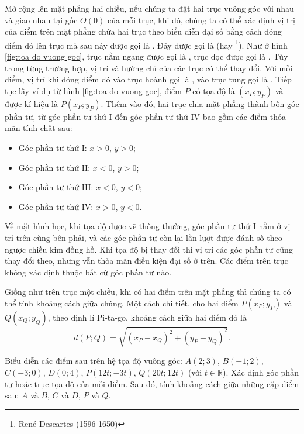 Mở rộng lên mặt phẳng hai chiều, nếu chúng ta đặt hai trục vuông góc với nhau và giao nhau tại gốc $O(0)$ của mỗi trục, khi đó, chúng ta có thể xác định vị trị của điểm trên mặt phẳng chứa hai trục theo biểu diễn đại số bằng cách dóng điểm đó lên trục mà sau này được gọi là . Đây được gọi là  (hay \footnote{René Descartes (1596-1650)}). Như ở hình \ref{fig:toa do vuong goc}, trục nằm ngang được gọi là , trục dọc được gọi là . Tùy trong từng trường hợp, vị trí và hướng chỉ của các trục có thể thay đổi. Với mỗi điểm, vị trí khi dóng điểm đó vào trục hoành gọi là , vào trục tung gọi là . Tiếp tục lấy ví dụ từ hình \ref{fig:toa do vuong goc}, điểm $P$ có tọa độ là $(x_P;y_P)$ và được kí hiệu là $P(x_P;y_P)$. Thêm vào đó, hai trục chia mặt phẳng thành bốn góc phần tư, từ góc phần tư thứ I đến góc phần tư thứ IV bao gồm các điểm thỏa mãn tính chất sau:
\begin{itemize}
   \item Góc phần tư thứ I: $x>0$, $y>0$;
   \item Góc phần tư thứ II: $x<0$, $y>0$;
   \item Góc phần tư thứ III: $x<0$, $y<0$;
   \item Góc phần tư thứ IV: $x>0$, $y<0$.
\end{itemize}
Về mặt hình học, khi tọa độ được vẽ thông thường, góc phần tư thứ I nằm ở vị trí trên cùng bên phải, và các góc phần tư còn lại lần lượt được đánh số theo ngược chiều kim đồng hồ. Khi tọa độ bị thay đổi thì vị trí các góc phần tư cũng thay đổi theo, nhưng vẫn thỏa mãn điều kiện đại số ở trên. Các điểm trên trục không xác định thuộc bất cứ góc phần tư nào.

Giống như trên trục một chiều, khi có hai điểm trên mặt phẳng thì chúng ta có thể tính khoảng cách giữa chúng. Một cách chi tiết, cho hai điểm $P(x_P;y_P)$ và $Q(x_Q;y_Q)$, theo định lí Pi-ta-go, khoảng cách giữa hai điểm đó là $$d(P;Q)=\sqrt{(x_P-x_Q)^2+(y_P-y_Q)^2}.$$

\exercise[ex:0.2] Biểu diễn các điểm sau trên hệ tọa độ vuông góc: $A(2;3)$, $B(-1;2)$, $C(-3;0)$, $D(0;4)$, $P(12t;-3t)$, $Q(20t;12t)$ (với $t \in \mathbb{R}$). Xác định góc phần tư hoặc trục tọa độ của mỗi điểm. Sau đó, tính khoảng cách giữa những cặp điểm sau: $A$ và $B$, $C$ và $D$, $P$ và $Q$.

\solution[ex:0.2]

